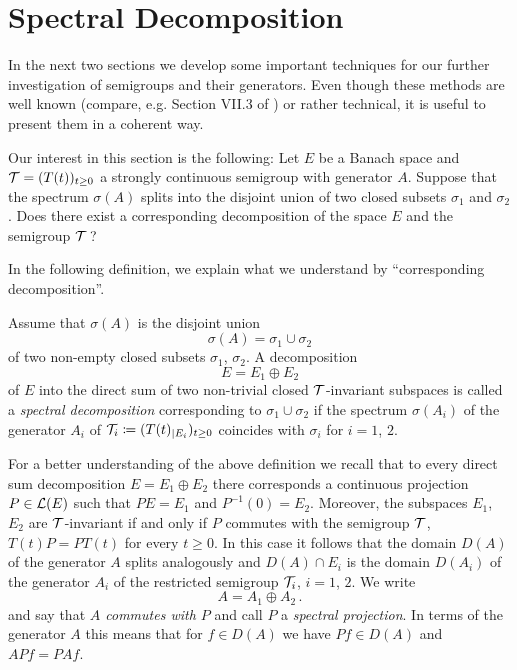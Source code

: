 \section{Spectral Decomposition}\label{sec:a3-3}
In the next two sections we develop some important techniques for our further investigation of semigroups and their generators.
Even though these methods are well known (compare, e.g. Section VII.3 of \citet{dunfordschwartz:1958}) or rather technical, it is useful to present them in a coherent way.

Our interest in this section is the following: Let $E$ be a Banach space and $\mathcal{T} = (T(t))_{t \geq 0}$ a strongly continuous semigroup with generator $A$.
Suppose that the spectrum $\sigma(A)$ splits into the disjoint union of two closed subsets $\sigma_{1}$ and $\sigma_{2}$.
Does there exist a corresponding decomposition of the space $E$ and the semigroup $\mathcal{T}$\,?

In the following definition, we explain what we understand by \enquote{corresponding decomposition}.
\begin{definition}\label{def:a3-3.1}
Assume that $\sigma(A)$ is the disjoint union
\[
\sigma(A) = \sigma_{1} \cup \sigma_{2}
\]
of two non-empty closed subsets $\sigma_{1}$, $\sigma_{2}$.
A decomposition
\[
E = E_{1} \oplus E_{2}
\]
of $E$ into the direct sum of two non-trivial closed $\mathcal{T}$-invariant subspaces is called a \emph{spectral decomposition} corresponding to $\sigma_{1} \cup \sigma_{2}$ if the spectrum $\sigma(A_{i})$ of the generator $A_{i}$ of $\mathcal{T}_{i} \coloneqq (T(t)_{|E_{i}})_{t \geq 0}$ coincides with $\sigma_{i}$ for $i = 1$, $2$.
\end{definition}
For a better understanding of the above definition we recall that to every direct sum decomposition $E = E_{1} \oplus E_{2}$ there corresponds a continuous projection $P \in \mathcal{L}(E)$ such that $PE = E_{1}$ and $P^{-1}(0) = E_{2}$.
Moreover, the subspaces $E_{1}$, $E_{2}$ are $\mathcal{T}$-invariant if and only if $P$ commutes with the semigroup $\mathcal{T}$, \ie $T(t)P = PT(t)$ for every $t \geq 0$.
In this case it follows that the domain $D(A)$ of the generator $A$ splits analogously and $D(A) \cap E_{i}$ is the domain $D(A_{i})$ of the generator $A_{i}$ of the restricted semigroup $\mathcal{T}_{i}$, $i = 1$, $2$.
We write
\[
A = A_{1} \oplus A_{2}\,.
\]
and say that \emph{$A$ commutes with $P$} and call $P$ a \emph{spectral projection}.
In terms of the generator $A$ this means that for $f \in D(A)$ we have $Pf \in D(A)$ and $APf = PAf$.

